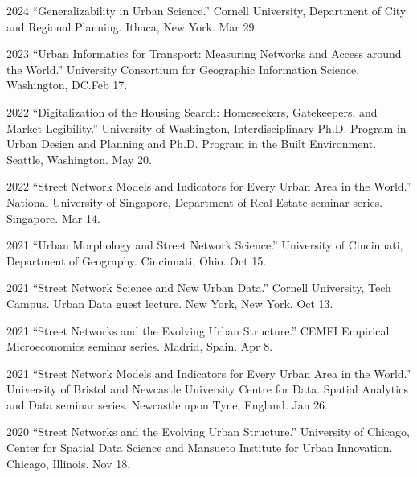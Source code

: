 \documentclass[11pt,letterpaper]{report}
\begin{document}
    \begin{tablist}

        \item[2024] \tab{}\enquote{Generalizability in Urban Science.} Cornell University, Department of City and Regional Planning. Ithaca, New York. Mar 29.

        \item[2023] \tab{}\enquote{Urban Informatics for Transport: Measuring Networks and Access around the World.} University Consortium for Geographic Information Science. Washington, DC.\@ Feb 17.

        \item[2022] \tab{}\enquote{Digitalization of the Housing Search: Homeseekers, Gatekeepers, and Market Legibility.} University of Washington, Interdisciplinary Ph.D. Program in Urban Design and Planning and Ph.D. Program in the Built Environment. Seattle, Washington. May 20.

        \item[2022] \tab{}\enquote{Street Network Models and Indicators for Every Urban Area in the World.} National University of Singapore, Department of Real Estate seminar series. Singapore. Mar 14.

        \item[2021] \tab{}\enquote{Urban Morphology and Street Network Science.} University of Cincinnati, Department of Geography. Cincinnati, Ohio. Oct 15.

        \item[2021] \tab{}\enquote{Street Network Science and New Urban Data.} Cornell University, Tech Campus. Urban Data guest lecture. New York, New York. Oct 13.

        \item[2021] \tab{}\enquote{Street Networks and the Evolving Urban Structure.} CEMFI Empirical Microeconomics seminar series. Madrid, Spain. Apr 8.

        \item[2021] \tab{}\enquote{Street Network Models and Indicators for Every Urban Area in the World.} University of Bristol and Newcastle University Centre for Data. Spatial Analytics and Data seminar series. Newcastle upon Tyne, England. Jan 26.

        \item[2020] \tab{}\enquote{Street Networks and the Evolving Urban Structure.} University of Chicago, Center for Spatial Data Science and Mansueto Institute for Urban Innovation. Chicago, Illinois. Nov 18.


\end{tablist}
\end{document}
